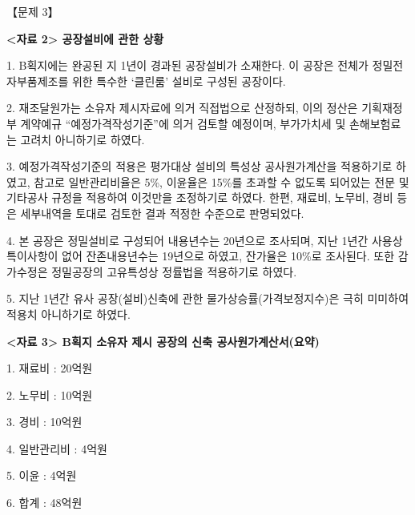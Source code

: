 \begin{longquestion}{【문제 3】}
\begin{center}
\end{center}
\textbf{<자료 2> 공장설비에 관한 상황} \par
1. B획지에는 완공된 지 1년이 경과된 공장설비가 소재한다. 이 공장은 전체가 정밀전자부품제조를 위한 특수한 ‘클린룸’ 설비로 구성된 공장이다. \par
2. 재조달원가는 소유자 제시자료에 의거 직접법으로 산정하되, 이의 정산은 기획재정부 계약예규 “예정가격작성기준”에 의거 검토할 예정이며, 부가가치세 및 손해보험료는 고려치 아니하기로 하였다. \par
3. 예정가격작성기준의 적용은 평가대상 설비의 특성상 공사원가계산을 적용하기로 하였고, 참고로 일반관리비율은 5\%, 이윤율은 15\%를 초과할 수 없도록 되어있는 전문 및 기타공사 규정을 적용하여 이것만을 조정하기로 하였다. 한편, 재료비, 노무비, 경비 등은 세부내역을 토대로 검토한 결과 적정한 수준으로 판명되었다. \par
4. 본 공장은 정밀설비로 구성되어 내용년수는 20년으로 조사되며, 지난 1년간 사용상 특이사항이 없어 잔존내용년수는 19년으로 하였고, 잔가율은 10\%로 조사된다. 또한 감가수정은 정밀공장의 고유특성상 정률법을 적용하기로 하였다. \par
5. 지난 1년간 유사 공장(설비)신축에 관한 물가상승률(가격보정지수)은 극히 미미하여 적용치 아니하기로 하였다. \par
\textbf{<자료 3> B획지 소유자 제시 공장의 신축 공사원가계산서(요약)} \par
1. 재료비 : 20억원 \par
2. 노무비 : 10억원 \par
3. 경비 : 10억원 \par
4. 일반관리비 : 4억원 \par
5. 이윤 : 4억원 \par
6. 합계 : 48억원 \par
\end{longquestion}
